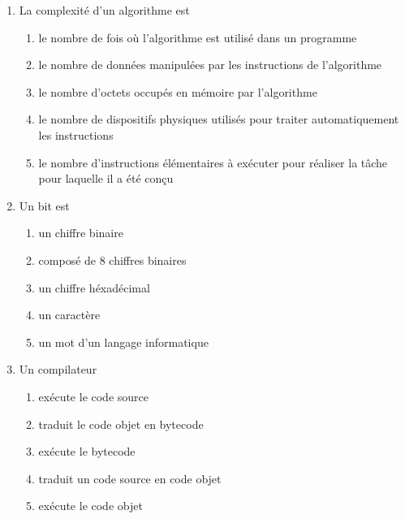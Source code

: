 \begin{td}
\begin{enumerate}
\begin{enumerate}
	\end{enumerate}
\item La complexité d'un algorithme est
	\begin{enumerate}
	\item le nombre de fois où l'algorithme est utilisé dans un programme
	\item le nombre de données manipulées par les instructions de
		l'algorithme
	\item le nombre d'octets occupés en mémoire par l'algorithme
	\item le nombre de dispositifs physiques utilisés pour traiter
		automatiquement les instructions
	\item le nombre d'instructions élémentaires à exécuter pour
		réaliser la tâche pour laquelle il a été conçu
	\end{enumerate}
\item Un bit est 
	\begin{enumerate}
	\item un chiffre binaire
	\item composé de 8 chiffres binaires
	\item un chiffre héxadécimal
	\item un caractère
	\item un mot d'un langage informatique
	\end{enumerate}
\item Un compilateur 
	\begin{enumerate}
	\item exécute le code source
	\item traduit le code objet en bytecode 
	\item exécute le bytecode
	\item traduit un code source en code objet
	\item exécute le code objet
	\end{enumerate}
\end{enumerate}
\end{td}

